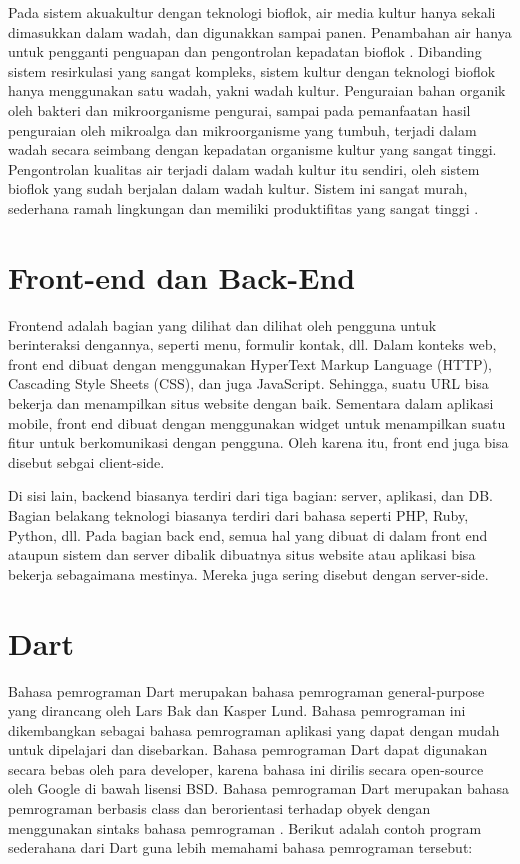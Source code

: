 Pada sistem akuakultur dengan teknologi bioflok, air media kultur hanya sekali dimasukkan dalam wadah, dan digunakkan sampai panen. Penambahan air hanya untuk pengganti penguapan dan pengontrolan kepadatan bioflok \citep{avnimelech2009}. Dibanding sistem resirkulasi yang sangat kompleks, sistem kultur dengan teknologi bioflok hanya menggunakan satu wadah, yakni wadah kultur. Penguraian bahan organik oleh bakteri dan mikroorganisme pengurai, sampai pada pemanfaatan hasil penguraian oleh mikroalga dan mikroorganisme yang tumbuh, terjadi dalam wadah secara seimbang dengan kepadatan organisme kultur yang sangat tinggi. Pengontrolan kualitas air terjadi dalam wadah kultur itu sendiri, oleh sistem bioflok yang sudah berjalan dalam wadah kultur. Sistem ini sangat murah, sederhana ramah lingkungan dan memiliki produktifitas yang sangat tinggi \citep{taw2012}.

\section{Front-end dan Back-End}

Frontend adalah bagian yang dilihat dan dilihat oleh pengguna untuk berinteraksi dengannya, seperti menu, formulir kontak, dll. Dalam konteks web, front end dibuat dengan menggunakan HyperText Markup Language (HTTP), Cascading Style Sheets (CSS), dan juga JavaScript. Sehingga, suatu URL bisa bekerja dan menampilkan situs website dengan baik. Sementara dalam aplikasi mobile, front end dibuat dengan menggunakan widget untuk menampilkan suatu fitur untuk berkomunikasi dengan pengguna. Oleh karena itu, front end juga bisa disebut sebgai client-side.

Di sisi lain, backend biasanya terdiri dari tiga bagian: server, aplikasi, dan DB. Bagian belakang teknologi biasanya terdiri dari bahasa seperti PHP, Ruby, Python, dll. Pada bagian back end, semua hal yang dibuat di dalam front end ataupun sistem dan server dibalik dibuatnya situs website atau aplikasi bisa bekerja sebagaimana mestinya. Mereka juga sering disebut dengan server-side.

\section{Dart}

Bahasa pemrograman Dart merupakan bahasa pemrograman general-purpose yang dirancang oleh Lars Bak dan Kasper Lund. Bahasa pemrograman ini dikembangkan sebagai bahasa pemrograman aplikasi yang dapat dengan mudah untuk dipelajari dan disebarkan. Bahasa pemrograman Dart dapat digunakan secara bebas oleh para developer, karena bahasa ini dirilis secara open-source oleh Google di bawah lisensi BSD. Bahasa pemrograman Dart merupakan bahasa pemrograman berbasis class dan berorientasi terhadap obyek dengan menggunakan sintaks bahasa pemrograman \citep{kelvin2021}. Berikut adalah contoh program sederahana dari Dart guna lebih memahami bahasa pemrograman tersebut:

